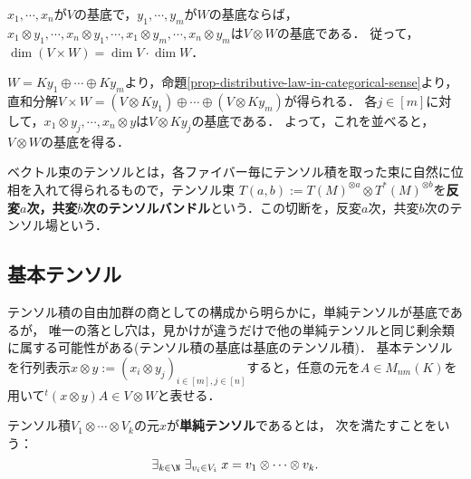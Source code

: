 \documentclass[uplatex, dvipdfmx]{jsreport}
\begin{document}
\begin{corollary}[テンソル空間の基底は基底のテンソル積]\label{cor-the-basis-of-tensor-product}
    $x_1,\cdots,x_n$が$V$の基底で，$y_1,\cdots,y_m$が$W$の基底ならば，$x_1\otimes y_1,\cdots,x_n\otimes y_1,\cdots,x_1\otimes y_m,\cdots,x_n\otimes y_m$は$V\otimes W$の基底である．
    従って，$\dim(V\times W)=\dim V\cdot\dim W$．
\end{corollary}
\begin{Proof}
    $W=Ky_1\oplus\cdots\oplus Ky_m$より，命題\ref{prop-distributive-law-in-categorical-sense}より，
    直和分解$V\times W=(V\otimes Ky_1)\oplus\cdots\oplus(V\otimes Ky_m)$が得られる．
    各$j\in[m]$に対して，$x_1\otimes y_j,\cdots,x_n\otimes y$は$V\otimes Ky_j$の基底である．
    よって，これを並べると，$V\otimes W$の基底を得る．
\end{Proof}

\begin{remarks}[ベクトル束のテンソル]
    ベクトル束のテンソルとは，各ファイバー毎にテンソル積を取った束に自然に位相を入れて得られるもので，テンソル束
    $T(a,b):=T(M)^{\otimes a}\otimes T^*(M)^{\otimes b}$を\textbf{反変$a$次，共変$b$次のテンソルバンドル}という．この切断を，反変$a$次，共変$b$次のテンソル場という．
\end{remarks}

\subsection{基本テンソル}

\begin{tcolorbox}[colframe=ForestGreen, colback=ForestGreen!10!white,breakable,colbacktitle=ForestGreen!40!white,coltitle=black,fonttitle=\bfseries\sffamily,
title=]
    テンソル積の自由加群の商としての構成から明らかに，単純テンソルが基底であるが，
    唯一の落とし穴は，見かけが違うだけで他の単純テンソルと同じ剰余類に属する可能性がある(テンソル積の基底は基底のテンソル積)．
    基本テンソルを行列表示$x\otimes y:=(x_i\otimes y_j)_{i\in[m],j\in[n]}$すると，任意の元を$A\in M_{nm}(K)$を用いて${}^t\!(x\otimes y)A\in V\otimes W$と表せる．
\end{tcolorbox}

\begin{definition}
    テンソル積$V_1\otimes\cdots\otimes V_k$の元$x$が\textbf{単純テンソル}であるとは，
    次を満たすことをいう：
    \[\exists_{k\in\N}\;\exists_{v_i\in V_i}\;x=v_1\otimes\cdots\otimes v_k.\]
\end{definition}
\end{document}
